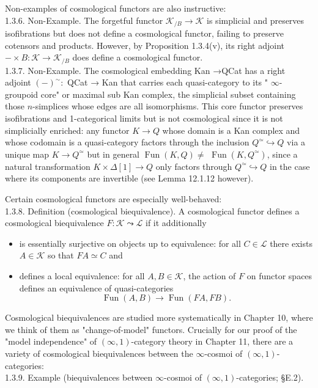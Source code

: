 \documentclass[10pt]{article}
\begin{document}
Non-examples of cosmological functors are also instructive:\\
1.3.6. Non-Example. The forgetful functor $\mathcal{K}_{/ B} \rightarrow \mathcal{K}$ is simplicial and preserves isofibrations but does not define a cosmological functor, failing to preserve cotensors and products. However, by Proposition 1.3.4(v), its right adjoint $-\times B: \mathcal{K} \rightarrow \mathcal{K}_{/ B}$ does define a cosmological functor.\\
1.3.7. Non-Example. The cosmological embedding Kan →QCat has a right adjoint $(-)^{\sim}:$ QCat → Kan that carries each quasi-category to its " $\infty$-groupoid core" or maximal sub Kan complex, the simplicial subset containing those $n$-simplices whose edges are all isomorphisms. This core functor preserves isofibrations and 1-categorical limits but is not cosmological since it is not simplicially enriched: any functor $K \rightarrow Q$ whose domain is a Kan complex and whose codomain is a quasi-category factors through the inclusion $Q^{\simeq} \hookrightarrow Q$ via a unique map $K \rightarrow Q^{\simeq}$ but in general $\operatorname{Fun}(K, Q) \neq$ $\operatorname{Fun}\left(K, Q^{\simeq}\right)$, since a natural transformation $K \times \Delta[1] \rightarrow Q$ only factors through $Q^{\simeq} \hookrightarrow Q$ in the case where its components are invertible (see Lemma 12.1.12 however).

Certain cosmological functors are especially well-behaved:\\
1.3.8. Definition (cosmological biequivalence). A cosmological functor defines a cosmological biequivalence $F: \mathcal{K} \leadsto \mathcal{L}$ if it additionally

\begin{itemize}
  \item[(i)] is essentially surjective on objects up to equivalence: for all $C \in \mathcal{L}$ there exists $A \in \mathcal{K}$ so that $F A \simeq C$ and
  \item[(ii)] defines a local equivalence: for all $A, B \in \mathcal{K}$, the action of $F$ on functor spaces defines an equivalence of quasi-categories
$$
\operatorname{Fun}(A, B) \longrightarrow \operatorname{Fun}(F A, F B) .
$$
\end{itemize}

Cosmological biequivalences are studied more systematically in Chapter 10, where we think of them as "change-of-model" functors. Crucially for our proof of the "model independence" of $(\infty, 1)$-category theory in Chapter 11, there are a variety of cosmological biequivalences between the $\infty$-cosmoi of $(\infty, 1)$-categories:\\
1.3.9. Example (biequivalences between $\infty$-cosmoi of $(\infty, 1)$-categories; §E.2).
\end{document}
